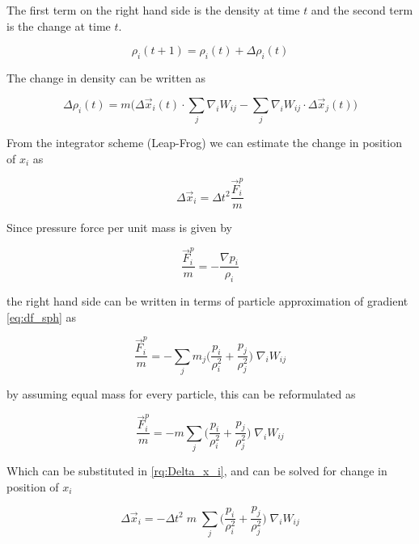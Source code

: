 The first term on the right hand side is the density at time $t$ and the
second term is the change at time $t$.

\begin{equation*}
  \rho_i(t+1) = \rho_i(t) + \Delta \rho_i(t)
\end{equation*}

The change in density can be written as

\begin{equation}
  \label{eq:density_difference}
  \Delta \rho_i(t) = m \big(\Delta\vec{x}_i(t) \cdot \sum_j \nabla_i W_{ij} - \sum_j \nabla_i W_{ij} \cdot \Delta\vec{x}_j(t) \big)
\end{equation}

From the integrator scheme (Leap-Frog) we can estimate the change in position
of $x_i$ as


\begin{equation*}
  \label{eq:Delta_x_i}
  \Delta \vec{x}_i = \Delta t^2
  \frac{\vec{F}_i^p}{m}
\end{equation*}

Since pressure force per unit mass is given by


\begin{equation*} \frac{\vec{F}_i^p}{m} = - \frac{\nabla p_i}{\rho_i}
\end{equation*}

the right hand side can be written in terms of particle approximation of
gradient \ref{eq:df_sph} as

\begin{equation*}
  \frac{\vec{F}_i^p}{m} = - \sum_j m_j \bigg(
  \frac{p_i}{\rho_i^2} + \frac{p_j}{\rho_j^2} \bigg)\;\nabla_i W_{ij}
\end{equation*}

by assuming equal mass for every particle, this can be reformulated as

\begin{equation*}
  \frac{\vec{F}_i^p}{m} = - m \sum_j \bigg(
  \frac{p_i}{\rho_i^2} + \frac{p_j}{\rho_j^2} \bigg)\;\nabla_i W_{ij}
\end{equation*}

Which can be substituted in \ref{rq:Delta_x_i}, and can be solved for change in
position of $x_i$

\begin{equation*}
  \Delta \vec{x}_i = - \Delta t^2 \; m \; \sum_j \bigg(
  \frac{p_i}{\rho_i^2} + \frac{p_j}{\rho_j^2} \bigg)\;\nabla_i W_{ij}
\end{equation*}

